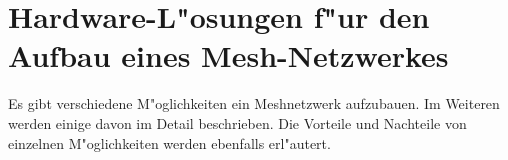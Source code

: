 \section{Hardware-L"osungen f"ur den Aufbau eines Mesh-Netzwerkes}

Es gibt verschiedene M"oglichkeiten ein Meshnetzwerk aufzubauen.
Im Weiteren werden einige davon im Detail beschrieben. 
Die Vorteile und Nachteile von einzelnen M"oglichkeiten werden ebenfalls erl"autert.




